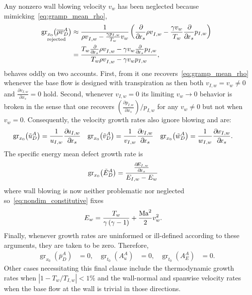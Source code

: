 Any nonzero wall blowing velocity $v_w$ has been neglected because
mimicking~\eqref{eq:gramp_mean_rho},
\begin{align}
    \label{eq:gramp_mean_rhov_alt}
    \underset{\text{rejected}}
             {\operatorname{gr}_{x_0}\!\left(\overline{\rho v}_D^A\right)}
    &\approx
    \frac{1}{{\rho v}_{I,w} - \frac{\gamma p_{I,w}}{T_w} v_w}
    \left(
          \frac{\partial\!}{\partial\!x_s}         {\rho v}_{I,w}
        - \frac{\gamma v_w}{T_w} \frac{\partial\!}{\partial\!x_s} {p}_{I,w}
    \right)
\\\notag
    &=
    \frac{%
          T_w \frac{\partial\!}{\partial\!x_s} {\rho v}_{I,w}
        - \gamma v_w \frac{\partial\!}{\partial\!x_s} {p     }_{I,w}
    }{%
        T_w {\rho v}_{I,w} - \gamma v_w p_{I,w}
    }
    ,
\end{align}
behaves oddly on two accounts.  First, from it one
recovers~\eqref{eq:gramp_mean_rho} whenever the base flow is designed with
transpiration as then both $v_{I,w} = v_w \neq 0$ and $\frac{\partial\!v_{I,w}}{\partial\!
x_s} = 0$ hold.  Second, whenever $v_{I,w} = 0$ its limiting $v_w \to 0$
behavior is broken in the sense that one recovers
$\left(\frac{\partial\!{p}_{I,w}}{\partial\!x_s}\right) / p_{I,w}$ for any $v_w
\neq 0$ but not when $v_w = 0$.
%
Consequently, the velocity growth rates also ignore blowing and are:
\begin{align}
    \operatorname{gr}_{x_0}\!\left(\tilde{u}_D^A\right)
    &=
    \frac{%
        1
    }{%
        {u}_{I,w}
    }
    \frac{\partial\!{u}_{I,w}}{\partial\!x_s}
    &
    \operatorname{gr}_{x_0}\!\left(\tilde{v}_D^A\right)
    &=
    \frac{%
        1
    }{%
        {v}_{I,w}
    }
    \frac{\partial\!{v}_{I,w} }{\partial\!x_s}
    &
    \operatorname{gr}_{x_0}\!\left(\tilde{w}_D^A\right)
    &=
    \frac{%
        1
    }{%
        {w}_{I,w}
    }
    \frac{\partial\!{w}_{I,w}}{\partial\!x_s}.
\end{align}
%
The specific energy mean defect growth rate is
\begin{align}
    \operatorname{gr}_{x_0}\!\left(\tilde{E}_D^A\right)
    &=
    \frac{%
        \frac{\partial\!{E}_{I,w}}{\partial\!x_s}
    }{%
        {E}_{I,w} - E_w
    }
\end{align}
where wall blowing is now neither problematic nor neglected
so~\eqref{eq:nondim_constitutive} fixes
\begin{align}
    E_w &= \frac{T_w}{\gamma \left(\gamma - 1\right)}
         + \frac{\mbox{Ma}_{}^2}{2} v_w^2.
\end{align}
%
Finally, whenever growth rates are uninformed or ill-defined according to these
arguments, they are taken to be zero.  Therefore,
\begin{align}
    \operatorname{gr}_{x_0}\!\left(\bar{p}_D^A\right) &= 0,
&
    \operatorname{gr}_{t_0}\!\left(A_u^A\right) &= 0,
&
    \operatorname{gr}_{t_0}\!\left(A_E^A\right) &= 0.
\end{align}
Other cases necessitating this final clause include the thermodynamic growth
rates when $\left| 1 - T_w / T_{I,w} \right| < 1\%$ and the wall-normal and
spanwise
velocity rates when the base flow at the wall is trivial
in those directions.
